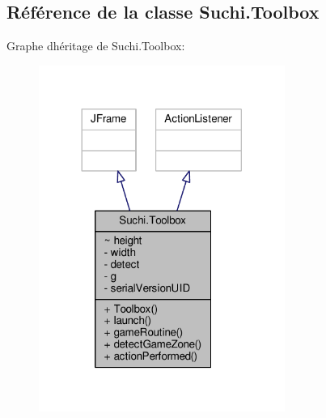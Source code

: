 \hypertarget{classSuchi_1_1Toolbox}{}\subsection{Référence de la classe Suchi.\+Toolbox}
\label{classSuchi_1_1Toolbox}


Graphe d\textquotesingle{}héritage de Suchi.\+Toolbox\+:\nopagebreak
\begin{figure}[H]
\begin{center}
\leavevmode
\includegraphics[width=228pt]{classSuchi_1_1Toolbox__inherit__graph}
\end{center}
\end{figure}


